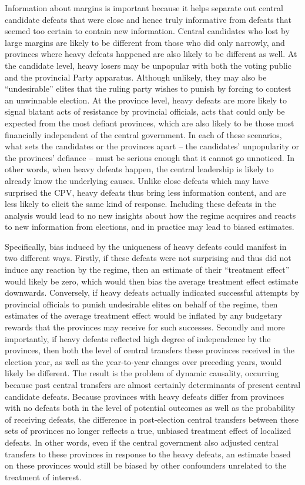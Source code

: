 \documentclass[12pt]{article}
\newcommand{\1}{\mathbbm{1}}
\begin{document}
Information about margins is important because it helps separate out central candidate defeats that were close and hence truly informative from defeats that seemed too certain to contain new information. Central candidates who lost by large margins are likely to be different from those who did only narrowly, and provinces where heavy defeats happened are also likely to be different as well. At the candidate level, heavy losers may be unpopular with both the voting public and the provincial Party apparatus. Although unlikely, they may also be ``undesirable'' elites that the ruling party wishes to punish by forcing to contest an unwinnable election. At the province level, heavy defeats are more likely to signal blatant acts of resistance by provincial officials, acts that could only be expected from the most defiant provinces, which are also likely to be those most financially independent of the central government. In each of these scenarios, what sets the candidates or the provinces apart -- the candidates' unpopularity or the provinces' defiance -- must be serious enough that it cannot go unnoticed. In other words, when heavy defeats happen, the central leadership is likely to already know the underlying causes. Unlike close defeats which may have surprised the CPV, heavy defeats thus bring less information content, and are less likely to elicit the same kind of response. Including these defeats in the analysis would lead to no new insights about how the regime acquires and reacts to new information from elections, and in practice may lead to biased estimates.

Specifically, bias induced by the uniqueness of heavy defeats could manifest in two different ways. Firstly, if these defeats were not surprising and thus did not induce any reaction by the regime, then an estimate of their ``treatment effect'' would likely be zero, which would then bias the average treatment effect estimate downwards. Conversely, if heavy defeats actually indicated successful attempts by provincial officials to punish undesirable elites on behalf of the regime, then estimates of the average treatment effect would be inflated by any budgetary rewards that the provinces may receive for such successes. Secondly and more importantly, if heavy defeats reflected high degree of independence by the provinces, then both the level of central transfers these provinces received in the election year, as well as the year-to-year changes over preceding years, would likely be different. The result is the problem of dynamic causality, occurring because past central transfers are almost certainly determinants of present central candidate defeats. Because provinces with heavy defeats differ from provinces with no defeats both in the level of potential outcomes as well as the probability of receiving defeats, the difference in post-election central transfers between these sets of provinces no longer reflects a true, unbiased treatment effect of localized defeats. In other words, even if the central government also adjusted central transfers to these provinces in response to the heavy defeats, an estimate based on these provinces would still be biased by other confounders unrelated to the treatment of interest. 
\end{document}
